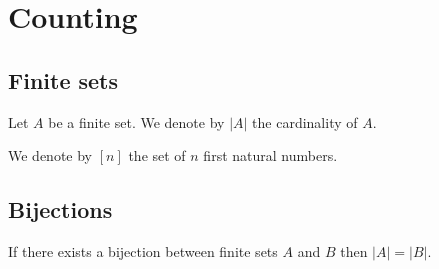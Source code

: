 \documentclass[../main.tex]{subfiles}
\begin{document}
\section{Counting}
\subsection{Finite sets}
Let $A$ be a finite set. We denote by $|A|$ the cardinality of $A$.
\begin{defn}\label{defn:First Numbersfirst_numbers}
	We denote by $[n]$ the set of $n$ first natural numbers.
\end{defn}
\subsection{Bijections}
\begin{thm}
	If there exists a bijection between finite sets $A$ and $ B$ then $|A|=|B|$.
\end{thm}
\end{document}
